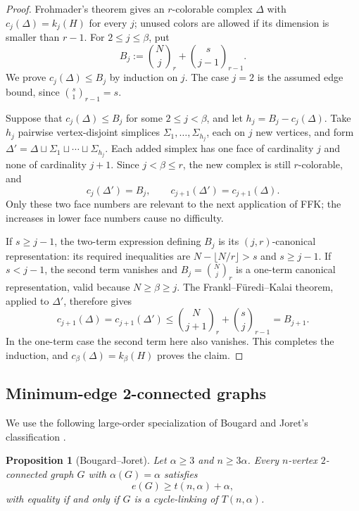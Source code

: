 \documentclass[11pt]{article}
\newtheorem{proposition}[proposition]{Proposition}
\theoremstyle{definition}
\begin{document}
\begin{proof}
Frohmader's theorem gives an $r$-colorable complex $\Delta$ with
$c_j(\Delta)=k_j(H)$ for every $j$; unused colors are allowed if its
dimension is smaller than $r-1$. For $2\le j\le\beta$, put
\[
 B_j:=\binom Nj_r+\binom{s}{j-1}_{r-1}.
\]
We prove $c_j(\Delta)\le B_j$ by induction on $j$. The case $j=2$
is the assumed edge bound, since $\binom{s}{1}_{r-1}=s$.

Suppose that $c_j(\Delta)\le B_j$ for some $2\le j<\beta$, and let
$h_j=B_j-c_j(\Delta)$. Take $h_j$ pairwise vertex-disjoint simplices
$\Sigma_1,\ldots,\Sigma_{h_j}$, each on $j$ new vertices, and form
$\Delta'=\Delta\sqcup\Sigma_1\sqcup\cdots\sqcup\Sigma_{h_j}$.
Each added simplex has one face of cardinality $j$ and none of
cardinality $j+1$. Since $j<\beta\le r$, the new complex is still
$r$-colorable, and
\[
 c_j(\Delta')=B_j,
 \qquad c_{j+1}(\Delta')=c_{j+1}(\Delta).
\]
Only these two face numbers are relevant to the next application of
FFK; the increases in lower face numbers cause no difficulty.

If $s\ge j-1$, the two-term expression defining $B_j$ is its
$(j,r)$-canonical representation: its required inequalities are
$N-\lfloor N/r\rfloor>s$ and $s\ge j-1$. If $s<j-1$, the second
term vanishes and $B_j=\binom Nj_r$ is a one-term canonical
representation, valid because $N\ge\beta\ge j$.
The Frankl--F\"uredi--Kalai theorem, applied to $\Delta'$, therefore
gives
\[
 c_{j+1}(\Delta)=c_{j+1}(\Delta')
 \le\binom N{j+1}_r+\binom{s}{j}_{r-1}=B_{j+1}.
\]
In the one-term case the second term here also vanishes. This
completes the induction, and $c_\beta(\Delta)=k_\beta(H)$ proves the
claim.
\end{proof}


\subsection{Minimum-edge 2-connected graphs}

We use the following large-order specialization of Bougard and
Joret's classification \cite[Proposition~6]{BougardJoret2008}.

\begin{proposition}[Bougard--Joret]\label{prop:BJ}
Let $\alpha\ge3$ and $n\ge3\alpha$. Every $n$-vertex $2$-connected
graph $G$ with $\alpha(G)=\alpha$ satisfies
\begin{equation}\label{eq:BJ-lower}
 e(G)\ge t(n,\alpha)+\alpha,
\end{equation}
with equality if and only if $G$ is a cycle-linking of $T(n,\alpha)$.
\end{proposition}
\end{document}

